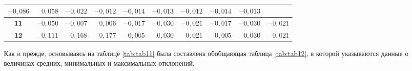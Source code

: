 \begin{table} [htbp]
{\begin{tabular}{|c|rrr|rrr|rrr|}
			\multicolumn{1}{r|}{$-0,086$}       & \multicolumn{1}{r|}{$ 0,058$}       & $-0,022$                            & \multicolumn{1}{r|}{$-0,012$}       & \multicolumn{1}{r|}{$-0,014$}       & $-0,013$                            & \multicolumn{1}{r|}{$-0,012$}       & \multicolumn{1}{r|}{$-0,014$}       & $-0,013$                            \\ \hline
					\textbf{11}                 & 
			\multicolumn{1}{r|}{$-0,050$}       & \multicolumn{1}{r|}{$-0,007$}       & $ 0,006$                            & \multicolumn{1}{r|}{$-0,017$}       & \multicolumn{1}{r|}{$-0,030$}       & $-0,021$                            & \multicolumn{1}{r|}{$-0,017$}       & \multicolumn{1}{r|}{$-0,030$}       & $-0,021$                            \\ \hline
			\textbf{12}                 		& 
			\multicolumn{1}{r|}{$-0,111$}       & \multicolumn{1}{r|}{$ 0,168$}       & $ 0,177$                            & \multicolumn{1}{r|}{$-0,005$}       & \multicolumn{1}{r|}{$-0,030$}       & $-0,021$                            & \multicolumn{1}{r|}{$-0,005$}       & \multicolumn{1}{r|}{$-0,030$}       & $-0,021$                            \\ \hline
		\end{tabular}
	}
\end{table}

Как и прежде, основываясь на таблице \cref{tab:tab11} была составлена обобщающая таблица \cref{tab:tab12}, в которой указываются данные о величинах средних, минимальных и максимальных отклонений.


